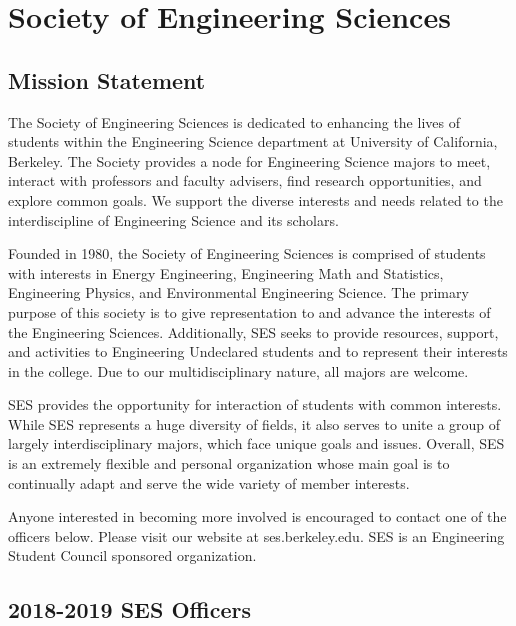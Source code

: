 \chapter*{Society of Engineering Sciences}

\textit{}

\section*{Mission Statement}

The Society of Engineering Sciences is dedicated to enhancing the lives of students within the Engineering Science department at University of California, Berkeley. The Society provides a node for Engineering Science majors to meet, interact with professors and faculty advisers, find research opportunities, and explore common goals. We support the diverse interests and needs related to the interdiscipline of Engineering Science and its scholars.

Founded in 1980, the Society of Engineering Sciences is comprised of students with interests in Energy Engineering, Engineering Math and Statistics, Engineering Physics, and Environmental Engineering Science. The primary purpose of this society is to give representation to and advance the interests of the Engineering Sciences. Additionally, SES seeks to provide resources, support, and activities to Engineering Undeclared students and to represent their interests in the college. Due to our multidisciplinary nature, all majors are welcome.

SES provides the opportunity for interaction of students with common interests. While SES represents a huge diversity of fields, it also serves to unite a group of largely interdisciplinary majors, which face unique goals and issues. Overall, SES is an extremely flexible and personal organization whose main goal is to continually adapt and serve the wide variety of member interests.

Anyone interested in becoming more involved is encouraged to contact one of the officers below. Please visit our website at ses.berkeley.edu. SES is an Engineering Student Council sponsored organization.

\section*{2018-2019 SES Officers}

